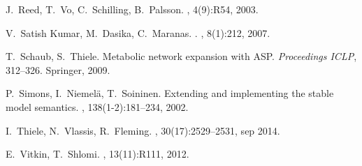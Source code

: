 \begin{thebibliography}{10}
J.~Reed, T.~Vo, C.~Schilling, B.~Palsson.
, 4(9):R54, 2003.

V.~{Satish Kumar}, M.~Dasika, C.~Maranas.
.
, 8(1):212, 2007.

T.~Schaub, S.~Thiele.
\newblock Metabolic network expansion with {ASP}.
\newblock
{\em Proceedings ICLP},
312--326. Springer, 2009.

P.~Simons, I.~Niemelä, T.~Soininen.
\newblock Extending and implementing the stable model semantics.
, 138(1-2):181--234, 2002.

I.~Thiele, N.~Vlassis, R.~Fleming.
, 30(17):2529--2531, sep 2014.

E.~Vitkin, T.~Shlomi.
, 13(11):R111, 2012.

\end{thebibliography}

